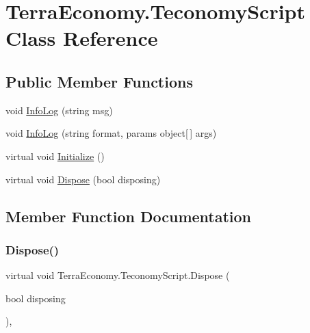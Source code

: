 \hypertarget{class_terra_economy_1_1_teconomy_script}{}\section{Terra\+Economy.\+Teconomy\+Script Class Reference}
\label{class_terra_economy_1_1_teconomy_script}
\subsection*{Public Member Functions}
\begin{DoxyCompactItemize}
\item 
void \hyperlink{class_terra_economy_1_1_teconomy_script_a3a1840826f1398abec838b57ae1dfd93}{Info\+Log} (string msg)
\item 
void \hyperlink{class_terra_economy_1_1_teconomy_script_af284bbfb9c616394ba5015840da1a1ba}{Info\+Log} (string format, params object\mbox{[}$\,$\mbox{]} args)
\item 
virtual void \hyperlink{class_terra_economy_1_1_teconomy_script_a80ea94a647ccea5d22ea5a887a2e019a}{Initialize} ()
\item 
virtual void \hyperlink{class_terra_economy_1_1_teconomy_script_aeed7399edc8126d246dc62bdf12e3360}{Dispose} (bool disposing)
\end{DoxyCompactItemize}


\subsection{Member Function Documentation}
\mbox{\label{class_terra_economy_1_1_teconomy_script_aeed7399edc8126d246dc62bdf12e3360}} 
\subsubsection{\texorpdfstring{Dispose()}{Dispose()}}
{\footnotesize\ttfamily virtual void Terra\+Economy.\+Teconomy\+Script.\+Dispose (\begin{DoxyParamCaption}\item[{bool}]{disposing }\end{DoxyParamCaption})\hspace{0.3cm}{\ttfamily [inline]}, {\ttfamily [virtual]}}

